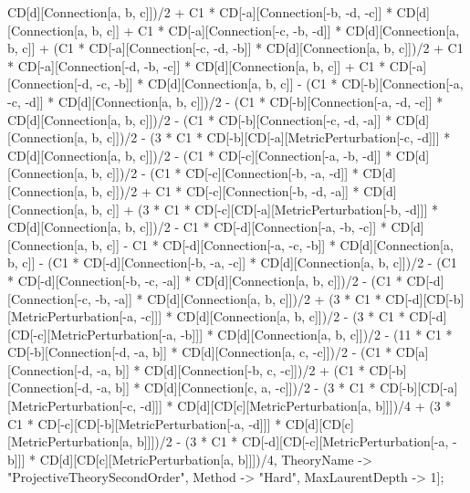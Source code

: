 CD[d][Connection[a, b, c]])/2 + C1 * CD[-a][Connection[-b, -d, -c]] * CD[d][Connection[a, b, c]] + C1 * CD[-a][Connection[-c, -b, -d]] * CD[d][Connection[a, b, c]] + (C1 * CD[-a][Connection[-c, -d, -b]] * CD[d][Connection[a, b, c]])/2 + C1 * CD[-a][Connection[-d, -b, -c]] * CD[d][Connection[a, b, c]] + C1 * CD[-a][Connection[-d, -c, -b]] * CD[d][Connection[a, b, c]] - (C1 * CD[-b][Connection[-a, -c, -d]] * CD[d][Connection[a, b, c]])/2 - (C1 * CD[-b][Connection[-a, -d, -c]] * CD[d][Connection[a, b, c]])/2 - (C1 * CD[-b][Connection[-c, -d, -a]] * CD[d][Connection[a, b, c]])/2 - (3 * C1 * CD[-b][CD[-a][MetricPerturbation[-c, -d]]] * CD[d][Connection[a, b, c]])/2 - (C1 * CD[-c][Connection[-a, -b, -d]] * CD[d][Connection[a, b, c]])/2 - (C1 * CD[-c][Connection[-b, -a, -d]] * CD[d][Connection[a, b, c]])/2 + C1 * CD[-c][Connection[-b, -d, -a]] * CD[d][Connection[a, b, c]] + (3 * C1 * CD[-c][CD[-a][MetricPerturbation[-b, -d]]] * CD[d][Connection[a, b, c]])/2 - C1 * CD[-d][Connection[-a, -b, -c]] * CD[d][Connection[a, b, c]] - C1 * CD[-d][Connection[-a, -c, -b]] * CD[d][Connection[a, b, c]] - (C1 * CD[-d][Connection[-b, -a, -c]] * CD[d][Connection[a, b, c]])/2 - (C1 * CD[-d][Connection[-b, -c, -a]] * CD[d][Connection[a, b, c]])/2 - (C1 * CD[-d][Connection[-c, -b, -a]] * CD[d][Connection[a, b, c]])/2 + (3 * C1 * CD[-d][CD[-b][MetricPerturbation[-a, -c]]] * CD[d][Connection[a, b, c]])/2 - (3 * C1 * CD[-d][CD[-c][MetricPerturbation[-a, -b]]] * CD[d][Connection[a, b, c]])/2 - (11 * C1 * CD[-b][Connection[-d, -a, b]] * CD[d][Connection[a, c, -c]])/2 - (C1 * CD[a][Connection[-d, -a, b]] * CD[d][Connection[-b, c, -c]])/2 + (C1 * CD[-b][Connection[-d, -a, b]] * CD[d][Connection[c, a, -c]])/2 - (3 * C1 * CD[-b][CD[-a][MetricPerturbation[-c, -d]]] * CD[d][CD[c][MetricPerturbation[a, b]]])/4 + (3 * C1 * CD[-c][CD[-b][MetricPerturbation[-a, -d]]] * CD[d][CD[c][MetricPerturbation[a, b]]])/2 - (3 * C1 * CD[-d][CD[-c][MetricPerturbation[-a, -b]]] * CD[d][CD[c][MetricPerturbation[a, b]]])/4, TheoryName -> "ProjectiveTheorySecondOrder", Method -> "Hard", MaxLaurentDepth -> 1]; 